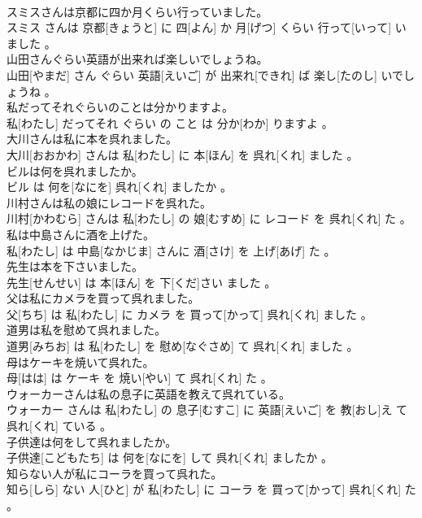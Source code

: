 \documentclass[8pt]{extreport}
\begin{document}
\begin{CJK}{UTF8}{min}
\\	スミスさんは京都に四か月くらい行っていました。	
\\	スミス さんは 京都[きょうと] に 四[よん] か 月[げつ] くらい 行って[いって] いました 。
\\	山田さんぐらい英語が出来れば楽しいでしょうね。	
\\	山田[やまだ] さん ぐらい 英語[えいご] が 出来れ[できれ] ば 楽し[たのし] いでしょうね 。
\\	私だってそれぐらいのことは分かりますよ。	
\\	私[わたし] だってそれ ぐらい の こと は 分か[わか] りますよ 。
\\	大川さんは私に本を呉れました。	
\\	大川[おおかわ] さんは 私[わたし] に 本[ほん] を 呉れ[くれ] ました 。
\\	ビルは何を呉れましたか。	
\\	ビル は 何を[なにを] 呉れ[くれ] ましたか 。
\\	川村さんは私の娘にレコードを呉れた。	
\\	川村[かわむら] さんは 私[わたし] の 娘[むすめ] に レコード を 呉れ[くれ] た 。
\\	私は中島さんに酒を上げた。	
\\	私[わたし] は 中島[なかじま] さんに 酒[さけ] を 上げ[あげ] た 。
\\	先生は本を下さいました。	
\\	先生[せんせい] は 本[ほん] を 下[くだ]さい ました 。
\\	父は私にカメラを買って呉れました。	
\\	父[ちち] は 私[わたし] に カメラ を 買って[かって] 呉れ[くれ] ました 。
\\	道男は私を慰めて呉れました。	
\\	道男[みちお] は 私[わたし] を 慰め[なぐさめ] て 呉れ[くれ] ました 。
\\	母はケーキを焼いて呉れた。	
\\	母[はは] は ケーキ を 焼い[やい] て 呉れ[くれ] た 。
\\	ウォーカーさんは私の息子に英語を教えて呉れている。	
\\	ウォーカー さんは 私[わたし] の 息子[むすこ] に 英語[えいご] を 教[おし]え て 呉れ[くれ] ている 。
\\	子供達は何をして呉れましたか。	
\\	子供達[こどもたち] は 何を[なにを] して 呉れ[くれ] ましたか 。
\\	知らない人が私にコーラを買って呉れた。	
\\	知ら[しら] ない 人[ひと] が 私[わたし] に コーラ を 買って[かって] 呉れ[くれ] た 。

\end{CJK}
\end{document}
